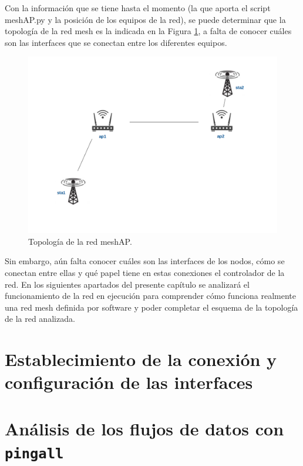 \documentclass[a4paper,12pt,twoside,spanish]{book}
\begin{document}
Con la información que se tiene hasta el momento (la que aporta el script meshAP.py y la posición de los equipos de la red), se puede determinar que la topología de la red mesh es la indicada en la Figura \ref{fig:topo_inicial}, a falta de conocer cuáles son las interfaces que se conectan entre los diferentes equipos.\par

	\begin{figure}[!h]
		\centering
		\includegraphics[scale=.4]{Figuras/topo_inicial.png}
		\caption{Topología de la red meshAP.}
		\label{fig:topo_inicial}
	\end{figure}

Sin embargo, aún falta conocer cuáles son las interfaces de los nodos, cómo se conectan entre ellas y qué papel tiene en estas conexiones el controlador de la red. En los siguientes apartados del presente capítulo se analizará el funcionamiento de la red en ejecución para comprender cómo funciona realmente una red mesh definida por software y poder completar el esquema de la topología de la red analizada.\par

\section{Establecimiento de la conexión y configuración de las interfaces}

\section{Análisis de los flujos de datos con \texttt{pingall}}
\end{document}
